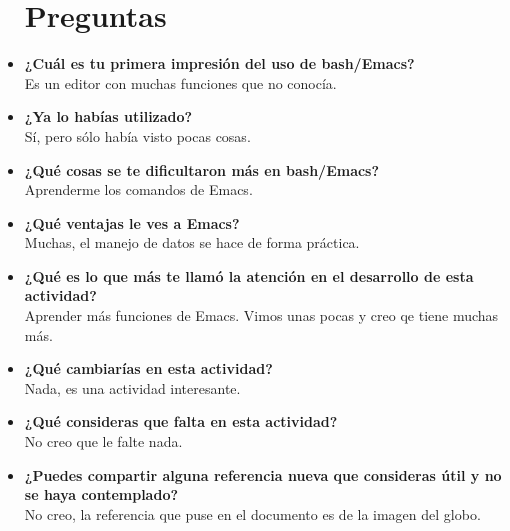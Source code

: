 \documentclass[a4paper]{article}
\begin{document}
\begin{itemize}
\section*{Preguntas}
\item {\bfseries ¿Cuál es tu primera impresión del uso de bash/Emacs?} \\
Es un editor con muchas funciones que no conocía.
\item {\bfseries ¿Ya lo habías utilizado?}\\
Sí, pero sólo había visto pocas cosas.
\item {\bfseries ¿Qué cosas se te dificultaron más en bash/Emacs?}\\
Aprenderme los comandos de Emacs.
\item {\bfseries ¿Qué ventajas le ves a Emacs?}\\
Muchas, el manejo de datos se hace de forma práctica.
\item {\bfseries ¿Qué es lo que más te llamó la atención en el desarrollo de esta actividad?}\\
Aprender más funciones de Emacs. Vimos unas pocas y creo qe tiene muchas más.
\item {\bfseries ¿Qué cambiarías en esta actividad?} \\
Nada, es una actividad interesante.
\item {\bfseries ¿Qué consideras que falta en esta actividad?} \\
No creo que le falte nada.
\item {\bfseries ¿Puedes compartir alguna referencia nueva que consideras útil y no se haya contemplado?} \\
No creo, la referencia que puse en el documento es de la imagen del globo.
\end{itemize}
\end{document}
